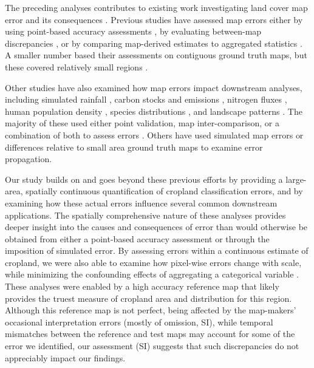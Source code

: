 \documentclass[a4paper]{article}
\begin{document}
The preceding analyses contributes to existing work investigating land cover map error and its consequences \citep[e.g.][]{fritz_highlighting_2011,verburg_challenges_2011,olofsson_making_2013}. Previous studies have assessed map errors either by using point-based accuracy assessments \citep[e.g.][]{olofsson_making_2013,frey_how_2007-1,foody_status_2002}, by evaluating between-map discrepancies \citep[e.g.][]{fritz_highlighting_2011,fritz_identifying_2008,fritz_comparison_2010}, or by comparing map-derived estimates to aggregated statistics \citep[e.g.][]{larsen_taken_2015,fritz_comparison_2010,yu_meta-discoveries_2014}. A smaller number based their assessments on contiguous ground truth maps, but these covered relatively small regions \cite[$<$3000 km$^2$, or $<$0.03\% of the area covered here;][]{dendoncker_exploring_2008,schmit_limitations_2006}.

Other studies have also examined how map errors impact downstream analyses, including simulated rainfall \citep{ge_impacts_2007}, carbon stocks and emissions \citep{goetz_mapping_2009, quaife_impact_2008, olofsson_making_2013,jain_co2_2013}, nitrogen fluxes \citep{jain_co2_2013,nol_effect_2008}, human population density \citep{linard_assessing_2010}, species distributions \citep{tuanmu_global_2014}, and landscape patterns \citep{langford_map_2006}. The majority of these used either point validation, map inter-comparison, or a combination of both to assess errors \citep{goetz_mapping_2009, olofsson_making_2013, jain_co2_2013, linard_assessing_2010, quaife_impact_2008,tuanmu_global_2014}. Others have used simulated map errors \citep{ge_impacts_2007,langford_map_2006} or differences relative to small area ground truth maps \citep[$<$1000 m;][]{nol_effect_2008} to examine error propagation.

Our study builds on and goes beyond these previous efforts by providing a large-area, spatially continuous quantification of cropland classification errors, and by examining how these actual errors influence several common downstream applications. The spatially comprehensive nature of these analyses provides deeper insight into the causes and consequences of error than would otherwise be obtained from either a point-based accuracy assessment or through the imposition of simulated error. By assessing errors within a continuous estimate of cropland, we were also able to examine how pixel-wise errors change with scale, while minimizing the confounding effects of aggregating a categorical variable \citep[][and see discussion in subsequent Recommendations section]{moody_influence_1995, marceau_remote_1999}. These analyses were enabled by a high accuracy reference map that likely provides the truest measure of cropland area and distribution for this region. Although this reference map is not perfect, being affected by the map-makers' occasional interpretation errors (mostly of omission, SI), while temporal mismatches between the reference and test maps may account for some of the error we identified, our assessment (SI) suggests that such discrepancies do not appreciably impact our findings. 
\end{document}
